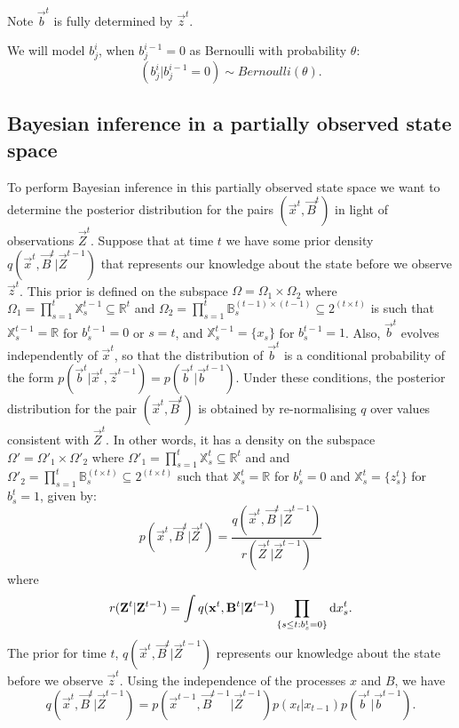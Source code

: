 Note $\vec{b}^{t}$ is fully determined by $\vec{z}^{t}$.

We will model $b_j^{i}$, when $b_j^{i-1} = 0$ as Bernoulli with probability $\theta$:
\begin{equation*}
    (b_j^{i} | b_j^{i-1} = 0) \sim Bernoulli(\theta).
\end{equation*}

\subsection{Bayesian inference in a partially observed state space}
\label{sec:4}

To perform Bayesian inference in this partially observed state space we want to determine the posterior distribution for the pairs $(\vec{x}^{t}, \vec{B}^{t})$ in light of observations $\vec{Z}^{t}$. Suppose that at time $t$ we have some prior density $q(\vec{x}^{t},\vec{B}^{t} | \vec{Z}^{t-1})$ that represents our knowledge about the state before we observe $\vec{z}^{t}$. This prior is defined on the subspace $\Omega = \Omega_1 \times \Omega_2$ where $\Omega_1 = \prod_{s=1}^t \mathbb{X}_s^{t-1} \subseteq \mathbb{R}^t$ and $\Omega_2 = \prod_{s=1}^t \mathbb{B}_s^{(t-1) \times (t-1)} \subseteq 2^{(t \times t)}$ is such that $\mathbb{X}_s^{t-1} = \mathbb{R}$ for $b_s^{t-1} = 0$ or $s=t$, and $\mathbb{X}_s^{t-1} = \{ x_s \}$ for $b_s^{t-1} = 1$. Also, $\vec{b}^{t}$ evolves independently of $\vec{x}^{t}$, so that the distribution of $\vec{b}^{t}$ is a conditional probability of the form $p(\vec{b}^{t} | \vec{x}^{t}, \vec{z}^{t-1} ) = p( \vec{b}^{t} | \vec{b}^{t-1} )$. Under these conditions, the posterior distribution for the pair $(\vec{x}^{t}, \vec{B}^{t})$ is obtained by re-normalising $q$ over values consistent with $\vec{Z}^{t}$. In other words, it has a density on the subspace $\Omega' = \Omega'_1 \times \Omega'_2$ where $\Omega'_1 = \prod_{s=1}^t \mathbb{X}_s^{t} \subseteq \mathbb{R}^t$ and and $\Omega'_2 = \prod_{s=1}^t \mathbb{B}_s^{(t \times t)} \subseteq 2^{(t \times t)}$ such that $\mathbb{X}_s^{t} = \mathbb{R}$ for $b_s^{t} = 0$ and $\mathbb{X}_s^{t} = \{ z_s^{t}\}$ for $b_s^{t} = 1$, given by:
\begin{equation*}
    p(\vec{x}^{t}, \vec{B}^{t} | \vec{Z}^{t}) = \frac{ q(\vec{x}^{t}, \vec{B}^{t}|\vec{Z}^{t-1})} {r(\vec{Z}^{t} | \vec{Z}^{t-1})}
\end{equation*}
where 
\begin{equation*}
    r(\mathbf{Z}^{t} | \mathbf{Z}^{t-1}) = \int q(\mathbf{x}^{t}, \mathbf{B}^{t}|\mathbf{Z}^{t-1}) \prod_{\{s \leq t: b_s^{t} = 0\}} \mathrm{d} x_s^{t}.
\end{equation*}
The prior for time $t$, $q(\vec{x}^{t},\vec{B}^{t} | \vec{Z}^{t-1})$ represents our knowledge about the state before we observe $\vec{z}^{t}$. Using the independence of the processes $x$ and $B$, we have
\begin{equation}
    q(\vec{x}^{t},\vec{B}^{t} | \vec{Z}^{t-1}) = p(\vec{x}^{t-1},\vec{B}^{t-1} | \vec{Z}^{t-1}) p(x_t | x_{t-1}) p(\vec{b}^{t} | \vec{b}^{t-1}).
    \label{eq:1}
\end{equation}


